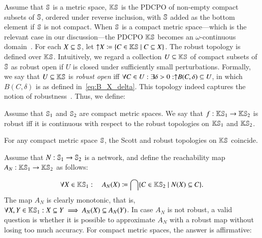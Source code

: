 \documentclass[11pt,times]{article}
\begin{document}
  Assume that $\mathbb{S}$ is a metric space, $\mathbb{K}\mathbb{S}$ is the
  \ac{PDCPO} of non-empty compact subsets of $\mathbb{S}$, ordered under
  reverse inclusion, with $\mathbb{S}$ added as the bottom element if
  $\mathbb{S}$ is not compact.  When $\mathbb{S}$ is a compact metric
  space---which is the relevant case in our discussion---the
  \ac{PDCPO} $\mathbb{K}\mathbb{S}$ becomes an $\omega$-continuous
  domain~\parencite[Proposition~3.4]{Edalat95:DT-fractals}. For each
  $X \subseteq \mathbb{S}$, let
  $\uparrow\negthickspace{X}\coloneqq\{{C \in \mathbb{K}\mathbb{S}} \mid {C\subseteq
    X}\}$. The robust topology is defined over
  $\mathbb{K}\mathbb{S}$. Intuitively, we regard a collection
  $U \subseteq \mathbb{K}\mathbb{S}$ of compact subsets of $\mathbb{S}$ as
  robust open if $U$ is closed under sufficiently small
  perturbations. Formally, we say that $U \subseteq \mathbb{K}\mathbb{S}$ is
  \emph{robust open} iff
  $ \forall C \in U : \exists \delta > 0 : \uparrow\negthickspace{B(C,\delta)}\subseteq
  U$, in which $B(C,\delta)$ is as defined
  in~\eqref{eq:B_X_delta}. This topology indeed captures the notion of
  robustness~\parencite[Theorem~A.2]{Moggi_Farjudian_Duracz_Taha:Reachability_Hybrid:2018}. Thus,
  we define:

\begin{definition}
  Assume that $\mathbb{S}_1$ and $\mathbb{S}_2$ are compact metric spaces. We
  say that $f : \mathbb{K}\mathbb{S}_1 \to \mathbb{K}\mathbb{S}_2$ is robust iff
  it is continuous with respect to the robust topologies on
  $\mathbb{K}\mathbb{S}_1$ and $\mathbb{K}\mathbb{S}_2$.
\end{definition}


  \begin{theorem}
    \label{thm:compact_metric}
    For any compact metric space $\mathbb{S}$, the Scott and robust topologies on
    $\mathbb{K}\mathbb{S}$ coincide.
  \end{theorem}


    
  Assume that $N : \mathbb{S}_1 \to \mathbb{S}_2$ is a network, and define the
  reachability map $A_N : \mathbb{K}\mathbb{S}_1 \to \mathbb{K}\mathbb{S}_2$ as
  follows:

  
\begin{equation}
  \label{eq:A_N_reachability_map}
  \forall X \in \mathbb{K}\mathbb{S}_1: \quad A_N(X) \coloneqq
  \bigcap \{{C \in \mathbb{K}\mathbb{S}_2} \mid {N(X) \subseteq C}\}.
\end{equation}
%
\noindent
The map $A_N$ is clearly monotonic, that is,
$\forall X, Y \in \mathbb{K}\mathbb{S}_1: X \subseteq Y \implies A_N(X)
\subseteq A_N(Y)$. In case $A_N$ is not robust, a valid question is
whether it is possible to approximate $A_N$ with a robust map without
losing too much accuracy. For compact metric spaces, the answer is
affirmative:
\end{document}
